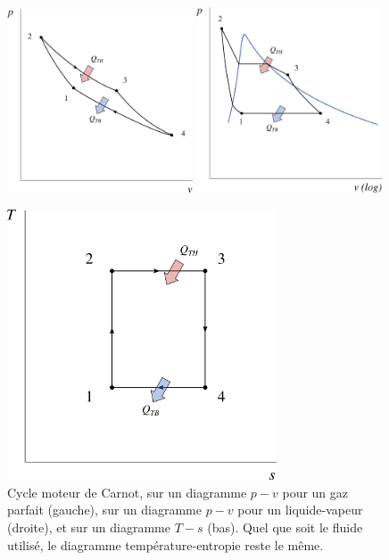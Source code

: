 		\begin{figure}
			\begin{center}
				\includegraphics[width=0.49\textwidth]{images/pv_carnot_gp.png}
				\includegraphics[width=0.49\textwidth]{images/pv_carnot_lv.png}
				\vspace{1cm}
				
				\includegraphics[width=8cm]{images/ts_carnot.png}
			\end{center}
			\caption{Cycle moteur de Carnot, sur un diagramme $p-v$ pour un gaz parfait (gauche), sur un diagramme $p-v$ pour un liquide-vapeur (droite), et sur un diagramme $T-s$ (bas). Quel que soit le fluide utilisé, le diagramme température-entropie reste le même.}
			\label{fig_ts_carnot}
		\end{figure}

